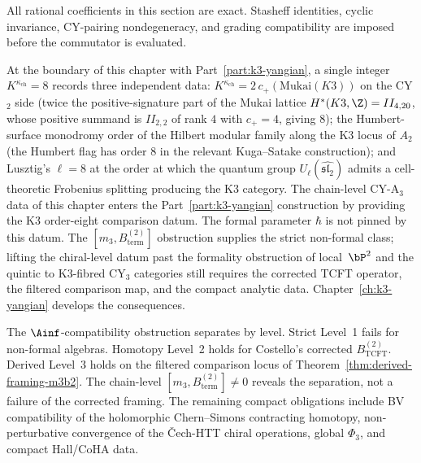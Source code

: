 \begin{remark}
\label{rem:computational-methodology}
All rational coefficients in this section are exact.  Stasheff
identities, cyclic invariance, CY-pairing nondegeneracy, and grading
compatibility are imposed before the commutator is evaluated.
\end{remark}

\begin{remark}
\label{rem:m3b2-three-faces-eight}
At the boundary of this chapter with Part~\ref{part:k3-yangian},
a single integer $K^{\kappa_{\mathrm{ch}}} = 8$ records three
independent data: $K^{\kappa_{\mathrm{ch}}}
= 2\,c_+(\mathrm{Mukai}(K3))$ on the CY$_2$ side (twice the
positive-signature part of the Mukai lattice $H^\ast(K3, \Z) =
II_{4,20}$, whose positive summand is $II_{2,2}$ of rank $4$
with $c_+ = 4$, giving $8$); the Humbert-surface monodromy
order of the Hilbert modular family along the K3 locus of $A_2$
(the Humbert flag has order $8$ in the relevant Kuga--Satake
construction); and Lusztig's $\ell = 8$ at the order at which
the quantum group $U_\ell(\widehat{\mathfrak{sl}_2})$ admits a
cell-theoretic Frobenius splitting producing the K3 category.
The chain-level CY-A$_3$ data of this chapter enters the
Part~\ref{part:k3-yangian} construction by providing the K3
order-eight comparison datum. The formal parameter \(\hbar\) is not
pinned by this datum. The $[m_3, B^{(2)}_{\mathrm{term}}]$
obstruction supplies the
strict non-formal class; lifting the chiral-level datum past
the formality obstruction of local~$\bP^2$ and the quintic to
K3-fibred CY$_3$ categories still requires the corrected TCFT
operator, the filtered comparison map, and the compact analytic
data. Chapter~\ref{ch:k3-yangian} develops the consequences.
\end{remark}

\bigskip

The $\Ainf$-compatibility obstruction separates by level.  Strict
Level~1 fails for non-formal algebras.  Homotopy Level~2 holds
for Costello's corrected $B^{(2)}_{\mathrm{TCFT}}$.  Derived
Level~3 holds on the filtered comparison locus of
Theorem~\ref{thm:derived-framing-m3b2}.  The chain-level
$[m_3, B^{(2)}_{\mathrm{term}}] \neq 0$ reveals the separation,
not a failure of the corrected framing. The remaining compact
obligations include BV compatibility of the holomorphic
Chern--Simons contracting homotopy, non-perturbative convergence
of the \v{C}ech-HTT chiral operations, global $\Phi_3$, and
compact Hall/CoHA data.

